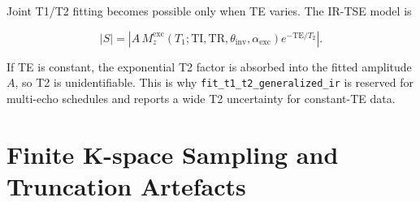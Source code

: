 Joint T1/T2 fitting becomes possible only when TE varies. The IR-TSE
model is

\begin{equation}
    |S| =
    \left|
        A\,
        M_z^{\mathrm{exc}}
        (T_1; \mathrm{TI}, \mathrm{TR},
         \theta_{\mathrm{inv}}, \alpha_{\mathrm{exc}})
        e^{-\mathrm{TE}/T_2}
    \right|.
\end{equation}

If TE is constant, the exponential T2 factor is absorbed into the fitted
amplitude \(A\), so T2 is unidentifiable. This is why
\texttt{fit\_t1\_t2\_generalized\_ir} is reserved for multi-echo
schedules and reports a wide T2 uncertainty for constant-TE data.

\section{Finite K-space Sampling and Truncation Artefacts}
\label{app:kspace-apodisation}
